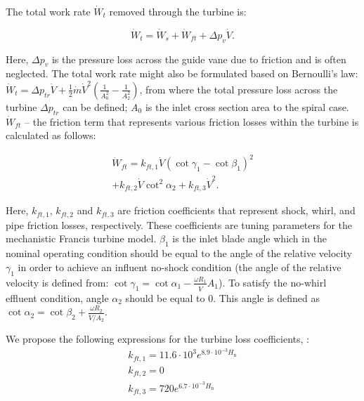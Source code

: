 \documentclass[%
]{USN-PhD}
\begin{document}
The total work rate $\dot{W}_t$ removed through the turbine is:

\begin{equation} \label{eq:eq38}
{\dot{W}_t} = {\dot{W}_s+\dot{W}_{ft}+\Delta p_v\dot{V}}.
\end{equation}

Here, $\Delta p_v$ is the pressure loss across the guide vane due to friction and is often neglected.
The total work rate might also be formulated based on Bernoulli's law: $\dot{W}_t=\Delta p_{tr}\dot{V} + \frac{1}{2}\dot{m}\dot{V}^2(\frac{1}{A_0^2}-\frac{1}{A_2^2})$, from where the total pressure loss across the turbine $\Delta p_{tr}$ can be defined; $A_0$ is the inlet cross section area to the spiral case. $\dot{W}_{ft}$ -- the friction term that represents various friction losses within the turbine is calculated as follows:

\begin{equation} \label{eq:eq39}
\begin{array}{ll}
\dot{W}_{ft} = k_{ft,1}\dot{V}(\cot{\gamma_1}-\cot{\beta_1})^2 \\
+k_{ft,2}\dot{V}\cot^2{\alpha_2}+k_{ft,3}\dot{V}^2.
\end{array}
\end{equation}

Here, $k_{ft,1}$, $k_{ft,2}$ and $k_{ft,3}$ are friction coefficients that represent shock, whirl, and pipe friction losses, respectively. These coefficients are tuning parameters for the mechanistic Francis turbine model. $\beta_1$ is the inlet blade angle which in the nominal operating condition should be equal to the angle of the relative velocity $\gamma_1$ in order to achieve an influent no-shock condition (the angle of the relative velocity is defined from: $\cot{\gamma_1}=\cot{\alpha_1}-\frac{\omega R_1}{\dot{V}}A_1$). To satisfy the no-whirl effluent condition, angle $\alpha_2$ should be equal to 0. This angle is defined as $\cot{\alpha_2}=\cot{\beta_2}+\frac{\omega R_2}{\dot{V}/A_2}$.

We propose the following expressions for the turbine loss coefficients, \cite{Vyt:19b}:
\begin{equation}
\begin{array}{c}
k_{ft,1} = 11.6\cdot10^3e^{8.9\cdot10^{-3}H_\mathrm{n}}\\
k_{ft,2} = 0\\
k_{ft,3} = 720e^{6.7\cdot10^{-3}H_\mathrm{n}}
\end{array}
\end{equation}
\end{document}
